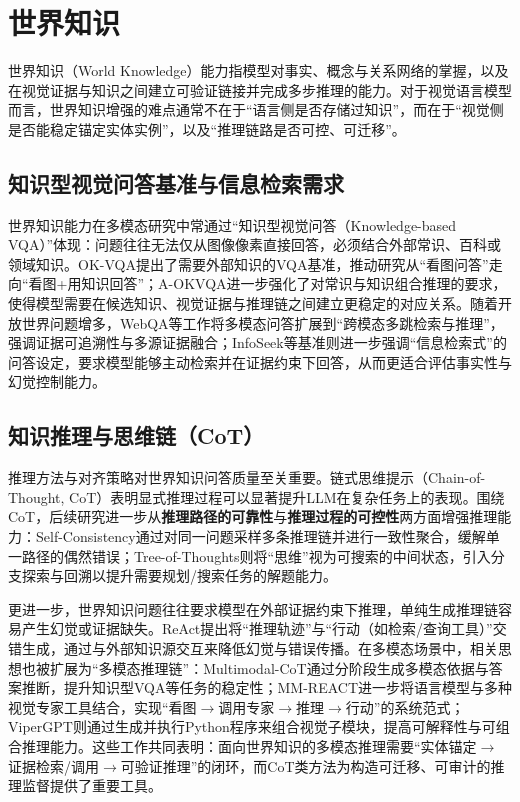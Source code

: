 \section{世界知识}
世界知识（World Knowledge）能力指模型对事实、概念与关系网络的掌握，以及在视觉证据与知识之间建立可验证链接并完成多步推理的能力。对于视觉语言模型而言，世界知识增强的难点通常不在于“语言侧是否存储过知识”，而在于“视觉侧是否能稳定锚定实体实例”，以及“推理链路是否可控、可迁移”。

\subsection{知识型视觉问答基准与信息检索需求}
世界知识能力在多模态研究中常通过“知识型视觉问答（Knowledge-based VQA）”体现：问题往往无法仅从图像像素直接回答，必须结合外部常识、百科或领域知识。OK-VQA提出了需要外部知识的VQA基准，推动研究从“看图问答”走向“看图+用知识回答”\citep{marino2019okvqa}；A-OKVQA进一步强化了对常识与知识组合推理的要求，使得模型需要在候选知识、视觉证据与推理链之间建立更稳定的对应关系\citep{schwenk2022aokvqa}。随着开放世界问题增多，WebQA等工作将多模态问答扩展到“跨模态多跳检索与推理”，强调证据可追溯性与多源证据融合\citep{chang2022webqa}；InfoSeek等基准则进一步强调“信息检索式”的问答设定，要求模型能够主动检索并在证据约束下回答，从而更适合评估事实性与幻觉控制能力\citep{chen2023infoseek}。

\subsection{知识推理与思维链（CoT）}
推理方法与对齐策略对世界知识问答质量至关重要。链式思维提示（Chain-of-Thought, CoT）表明显式推理过程可以显著提升LLM在复杂任务上的表现\citep{wei2022chain}。围绕CoT，后续研究进一步从\textbf{推理路径的可靠性}与\textbf{推理过程的可控性}两方面增强推理能力：Self-Consistency通过对同一问题采样多条推理链并进行一致性聚合，缓解单一路径的偶然错误\citep{wang2022selfconsistency}；Tree-of-Thoughts则将“思维”视为可搜索的中间状态，引入分支探索与回溯以提升需要规划/搜索任务的解题能力\citep{yao2023tot}。

更进一步，世界知识问题往往要求模型在外部证据约束下推理，单纯生成推理链容易产生幻觉或证据缺失。ReAct提出将“推理轨迹”与“行动（如检索/查询工具）”交错生成，通过与外部知识源交互来降低幻觉与错误传播\citep{yao2023react}。在多模态场景中，相关思想也被扩展为“多模态推理链”：Multimodal-CoT通过分阶段生成多模态依据与答案推断，提升知识型VQA等任务的稳定性\citep{zhang2023multimodalcot}；MM-REACT进一步将语言模型与多种视觉专家工具结合，实现“看图$\rightarrow$调用专家$\rightarrow$推理$\rightarrow$行动”的系统范式\citep{yang2023mmreact}；ViperGPT则通过生成并执行Python程序来组合视觉子模块，提高可解释性与可组合推理能力\citep{suris2023vipergpt}。这些工作共同表明：面向世界知识的多模态推理需要“实体锚定$\rightarrow$证据检索/调用$\rightarrow$可验证推理”的闭环，而CoT类方法为构造可迁移、可审计的推理监督提供了重要工具。

